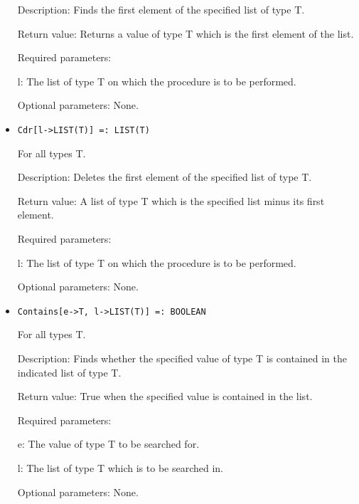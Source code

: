 \begin{itemize}
\bd
\item
[Description:] Finds the first element of the specified list of type
T.
\item
[Return value:] Returns a value of type T which is the first element
of the list.
\item 
[Required parameters:]\hfil\null
	
\bd
\item
[l:] The list of type T on which the procedure is to be performed.
\ed

\item
[Optional parameters:] None.
\ed

\item

\protect \large \begin{verbatim}
Cdr[l->LIST(T)] =: LIST(T)
\end{verbatim}\normalsize

For all types T.

\bd
\item
[Description:] Deletes the first element of the specified list of type
T.
\item 
[Return value:] A list of type T which is the specified list minus its
first element.
\item   
[Required parameters:]\hfil\null

\bd
\item
[l:] The list of type T on which the procedure is to be performed.
\ed
\item
[Optional parameters:] None.
\ed

\item
\protect \large \begin{verbatim}
Contains[e->T, l->LIST(T)] =: BOOLEAN
\end{verbatim}\normalsize

For all types T.

\bd
\item
[Description:] Finds whether the specified value of type T is
contained in the indicated list of type T.
\item 
[Return value:] True when the specified value is contained in the
list.
\item
[Required parameters:]\hfil\null
	
\bd
\item	
[e:] The value of type T to be searched for.
\item
[l:] The list of type T which is to be searched in.
\ed

\item
[Optional parameters:] None.
\ed


\end{itemize}
